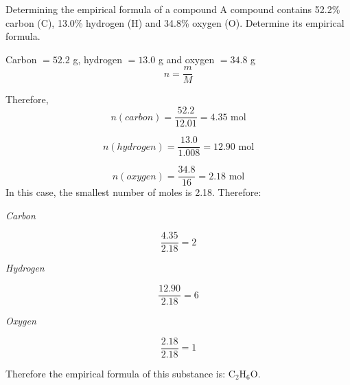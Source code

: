 \begin{wex}{Determining the empirical formula of a compound}{
A compound contains 52.2\% carbon (C), 13.0\% hydrogen (H) and 34.8\% oxygen (O). Determine its empirical formula.}{
Carbon $= 52.2$ g, hydrogen $= 13.0$ g and oxygen $= 34.8$ g
\begin{equation*}
n = \frac{m}{M}
\end{equation*}

Therefore,
\begin{equation*}
n(carbon) = \frac{52.2}{12.01} = 4.35 \text{ mol}
\end{equation*}

\begin{equation*}
n(hydrogen) = \frac{13.0}{1.008} = 12.90 \text{ mol}
\end{equation*}

\begin{equation*}
n(oxygen) = \frac{34.8}{16} = 2.18 \text{ mol}
\end{equation*}
In this case, the smallest number of moles is 2.18. Therefore:

\textit{Carbon}

\begin{equation*}
\frac{4.35}{2.18} = 2
\end{equation*}

\textit{Hydrogen}

\begin{equation*}
\frac{12.90}{2.18} = 6
\end{equation*}

\textit{Oxygen}

\begin{equation*}
\frac{2.18}{2.18} = 1
\end{equation*}

Therefore the empirical formula of this substance is: $\text{C}_{2}\text{H}_{6}\text{O}$.
}
\end{wex}

